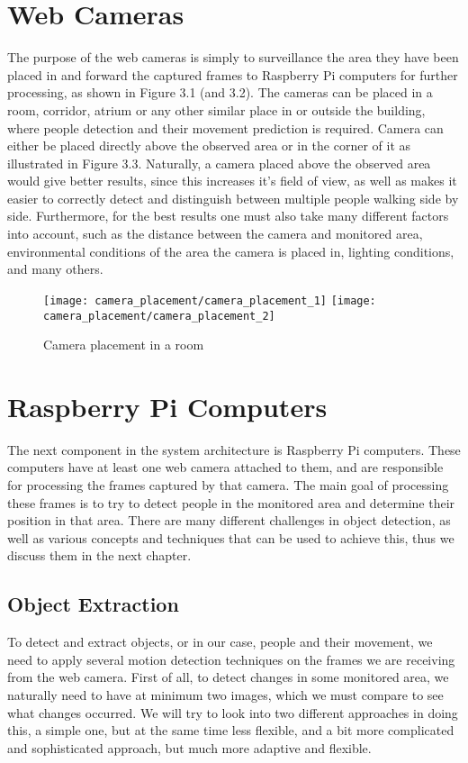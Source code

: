 \section{Web Cameras}
The purpose of the web cameras is simply to surveillance the area they have been placed in and forward the captured frames to Raspberry Pi computers for further processing, as shown in Figure 3.1 (and 3.2). The cameras can be placed in a room, corridor, atrium or any other similar place in or outside the building, where people detection and their movement prediction is required. Camera can either be placed directly above the observed area or in the corner of it as illustrated in Figure 3.3. Naturally, a camera placed above the observed area would give better results, since this increases it's field of view, as well as makes it easier to correctly detect and distinguish between multiple people walking side by side. Furthermore, for the best results one must also take many different factors into account, such as
the distance between the camera and monitored area, environmental conditions of the area the camera is placed in, lighting conditions, and many others.

\begin{figure}[ht]
	\begin{center}
	\texttt{[image: camera\_placement/camera\_placement\_1]}
	\texttt{[image: camera\_placement/camera\_placement\_2]}
	\caption{Camera placement in a room}
	\end{center}
\end{figure}

\section{Raspberry Pi Computers}
The next component in the system architecture is Raspberry Pi computers. These computers have at least one web camera attached to them, and are responsible for processing the frames captured by that camera. The main goal of processing these frames is to try to detect people in the monitored area and determine their position in that area. There are many different challenges in object detection, as well as various concepts and techniques that can be used to achieve this, thus we discuss them in the next chapter.
	
	\subsection{Object Extraction}
	To detect and extract objects, or in our case, people and their movement, we need to apply several motion detection techniques on the frames we are receiving from the web camera. First of all, to detect changes in some monitored area, we naturally need to have at minimum two images, which we must compare to see what changes occurred. We will try to look into two different approaches in doing this, a simple one, but at the same time less flexible, and a bit more complicated and sophisticated approach, but much more adaptive and flexible.
	
